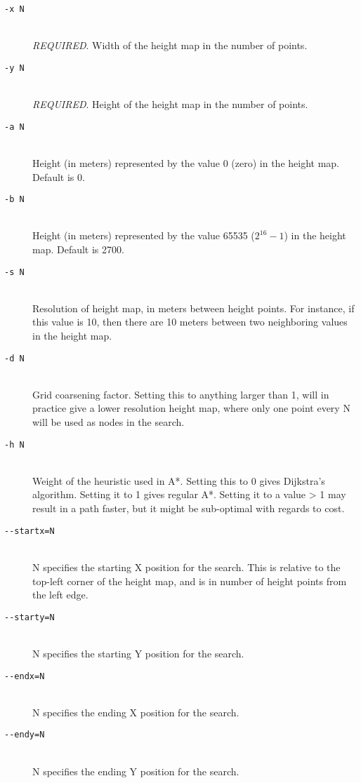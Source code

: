 \begin{description}
\item[\texttt{-x N}] \hfill \\
\textit{REQUIRED}. Width of the height map in the number of points. 

\item[\texttt{-y N}] \hfill \\
\textit{REQUIRED}. Height of the height map in the number of points. 

\item[\texttt{-a N}] \hfill \\
Height (in meters) represented by the value 0 (zero) in the height map. Default is 0.

\item[\texttt{-b N}] \hfill \\
Height (in meters) represented by the value 65535 ($2^{16}-1$) in the height map. Default is 2700.

\item[\texttt{-s N}] \hfill \\
Resolution of height map, in meters between height points. For instance, if this value is 10, then there are 10 meters between two neighboring values in the height map.

\item[\texttt{-d N}] \hfill \\
Grid coarsening factor. Setting this to anything larger than 1, will in practice give a lower resolution height map, where only one point every N will be used as nodes in the search.

\item[\texttt{-h N}] \hfill \\
Weight of the heuristic used in A*. Setting this to 0 gives Dijkstra's algorithm. Setting it to 1 gives regular A*. Setting it to a value > 1 may result in a path faster, but it might be sub-optimal with regards to cost.

\item[\texttt{-{-}startx=N}] \hfill \\
N specifies the starting X position for the search. This is relative to the top-left corner of the height map, and is in number of height points from the left edge.

\item[\texttt{-{-}starty=N}] \hfill \\
N specifies the starting Y position for the search. 

\item[\texttt{-{-}endx=N}] \hfill \\
N specifies the ending X position for the search. 

\item[\texttt{-{-}endy=N}] \hfill \\
N specifies the ending Y position for the search. 

\end{description}

